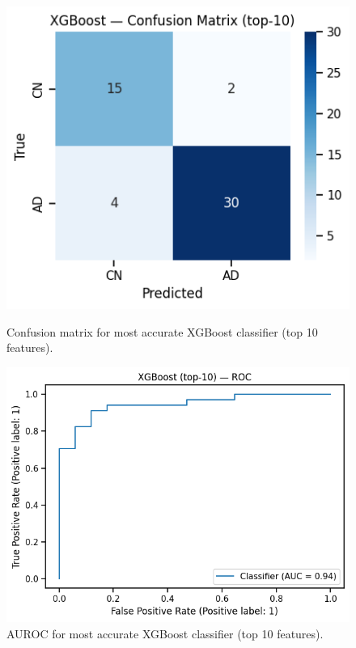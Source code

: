 \documentclass[a4paper,12pt]{article}
\begin{document}
\begin{figure}[H]
\centering
\begin{minipage}{0.48\textwidth}
    \centering
    \includegraphics[width=\textwidth]{Pics/xgboost_confusion_matrix_10.png}
    \caption{Confusion matrix for most accurate XGBoost classifier (top 10 features).}
    \label{fig:xgboost-cm}
\end{minipage}
\hfill
\begin{minipage}{0.48\textwidth}
    \centering
    \includegraphics[width=\textwidth]{Pics/xgboost_roc_10.png}
    \caption{AUROC for most accurate XGBoost classifier (top 10 features).}
    \label{fig:xgboost-roc}
\end{minipage}
\end{figure}
\end{document}
